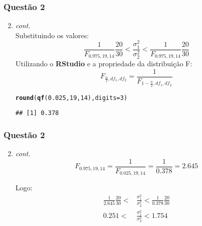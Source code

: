 \documentclass{beamer}\usepackage[]{graphicx}\usepackage[]{color}
\makeatletter
\newcommand{\hlnum}[1]{\textcolor[rgb]{0.686,0.059,0.569}{#1}}%
\newcommand{\hlstd}[1]{\textcolor[rgb]{0.345,0.345,0.345}{#1}}%
\newcommand{\hlkwc}[1]{\textcolor[rgb]{0.333,0.667,0.333}{#1}}%
\newcommand{\hlkwd}[1]{\textcolor[rgb]{0.737,0.353,0.396}{\textbf{#1}}}%
\newenvironment{kframe}{%
 \def\at@end@of@kframe{}%
 \ifinner\ifhmode%
  \def\at@end@of@kframe{\end{minipage}}%
  \begin{minipage}{\columnwidth}%
 \fi\fi%
 \def\FrameCommand##1{\hskip\@totalleftmargin \hskip-\fboxsep
 \colorbox{shadecolor}{##1}\hskip-\fboxsep
     \hskip-\linewidth \hskip-\@totalleftmargin \hskip\columnwidth}%
 \MakeFramed {\advance\hsize-\width
   \@totalleftmargin\z@ \linewidth\hsize
   \@setminipage}}%
 {\par\unskip\endMakeFramed%
 \at@end@of@kframe}
\newenvironment{knitrout}{}{} %
\makeatother
\begin{document}
	\begin{frame}[fragile]
		\frametitle{Questão 2}
		\begin{enumerate}
			\setcounter{enumi}{1}
			\item \textit{cont.}\\
			Substituindo os valores:\\
			$$\frac{1}{F_{0.975,19,14}}\frac{20}{30} < \frac{\sigma_{1}^{2}}{\sigma_{2}^{2}} < \frac{1}{F_{0.975,19,14}}\frac{20}{30}$$
			Utilizando o \textbf{RStudio} e a propriedade da distribuição F:$$F_{\frac{\alpha}{2},df_{1},df_{2}} = \frac{1}{F_{1-\frac{\alpha}{2},df_{1},df_{2}}}$$
\begin{knitrout}
\color{fgcolor}\begin{kframe}
\begin{alltt}
\hlkwd{round}\hlstd{(}\hlkwd{qf}\hlstd{(}\hlnum{0.025}\hlstd{,}\hlnum{19}\hlstd{,}\hlnum{14}\hlstd{),}\hlkwc{digits} \hlstd{=} \hlnum{3}\hlstd{)}
\end{alltt}
\begin{verbatim}
## [1] 0.378
\end{verbatim}
\end{kframe}
\end{knitrout}
			
		\end{enumerate}
	\end{frame}
	
	\begin{frame}
		\frametitle{Questão 2}
		\begin{enumerate}
			\setcounter{enumi}{1}
			\item \textit{cont.}\\
			$$F_{0.975,19,14} = \frac{1}{F_{0.025,19,14}} = \frac{1}{0.378} = 2.645$$
			
			Logo:
			\begin{align*}
				\frac{1}{2.645}\frac{20}{30} < &\frac{\sigma_{1}^{2}}{\sigma_{2}^{2}} < \frac{1}{0.378}\frac{20}{30}\\ 0.251 < &\frac{\sigma_{1}^{2}}{\sigma_{2}^{2}} < 1.754
			\end{align*}
		\end{enumerate}	
	\end{frame}
	
\end{document}
